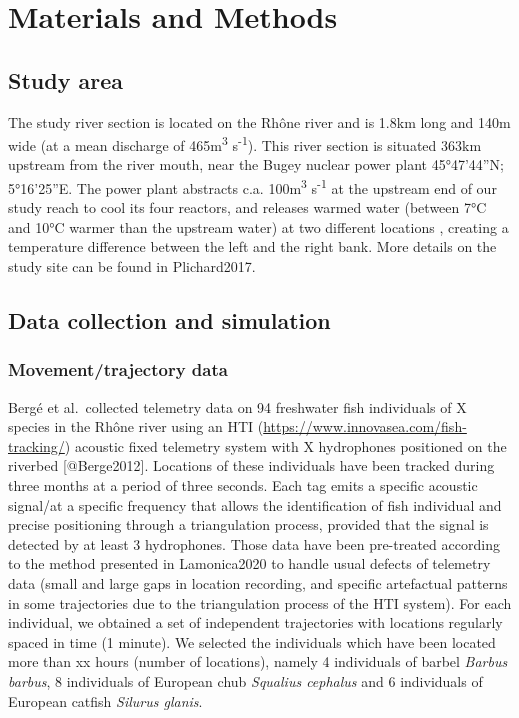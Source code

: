 \documentclass[
  letterpaper,
  DIV=11,
  numbers=noendperiod]{scrartcl}
\begin{document}
\hypertarget{materials-and-methods}{%
\section{Materials and Methods}\label{materials-and-methods}}

\hypertarget{study-area}{%
\subsection{Study area}\label{study-area}}

The study river section is located on the Rhône river and is 1.8km long
and 140m wide (at a mean discharge of 465m\textsuperscript{3}
s\textsuperscript{-1}). This river section is situated 363km upstream
from the river mouth, near the Bugey nuclear power plant 45°47'44''N;
5°16'25''E. The power plant abstracts c.a. 100m\textsuperscript{3}
s\textsuperscript{-1} at the upstream end of our study reach to cool its
four reactors, and releases warmed water (between 7°C and 10°C warmer
than the upstream water) at two different locations , creating a
temperature difference between the left and the right bank. More details
on the study site can be found in Plichard2017.

\hypertarget{data-collection-and-simulation}{%
\subsection{Data collection and
simulation}\label{data-collection-and-simulation}}

\hypertarget{movementtrajectory-data}{%
\subsubsection{Movement/trajectory data}\label{movementtrajectory-data}}

Bergé et al.~collected telemetry data on 94 freshwater fish individuals
of X species in the Rhône river using an HTI
(\url{https://www.innovasea.com/fish-tracking/}) acoustic fixed
telemetry system with X hydrophones positioned on the riverbed
{[}@Berge2012{]}. Locations of these individuals have been tracked
during three months at a period of three seconds. Each tag emits a
specific acoustic signal/at a specific frequency that allows the
identification of fish individual and precise positioning through a
triangulation process, provided that the signal is detected by at least
3 hydrophones. Those data have been pre-treated according to the method
presented in Lamonica2020 to handle usual defects of telemetry data
(small and large gaps in location recording, and specific artefactual
patterns in some trajectories due to the triangulation process of the
HTI system). For each individual, we obtained a set of independent
trajectories with locations regularly spaced in time (1 minute). We
selected the individuals which have been located more than xx hours
(number of locations), namely 4 individuals of barbel \emph{Barbus
barbus}, 8 individuals of European chub \emph{Squalius cephalus} and 6
individuals of European catfish \emph{Silurus glanis}.
\end{document}
